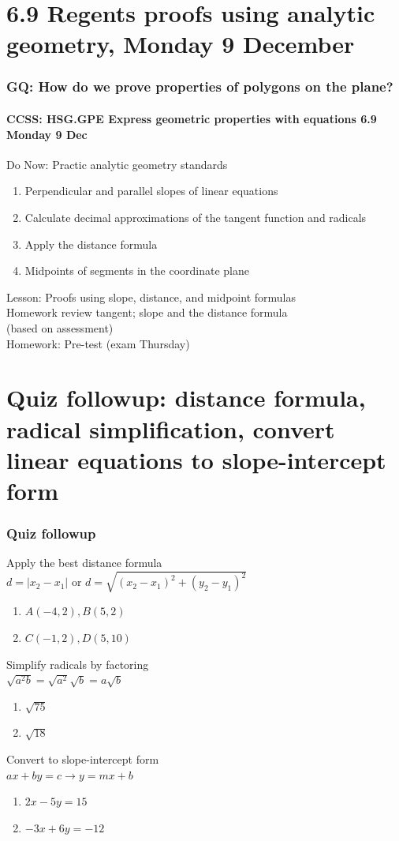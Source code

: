 \documentclass{beamer}
\begin{document}
\section{6.9 Regents proofs using analytic geometry, Monday 9 December}
\frame
{
  \frametitle{GQ: How do we prove properties of polygons on the plane?}
  \framesubtitle{CCSS: HSG.GPE Express geometric properties with equations \hfill \alert{6.9 Monday 9 Dec}}

  \begin{block}{Do Now: Practic analytic geometry standards}
  \begin{enumerate}
    \item Perpendicular and parallel slopes of linear equations
    \item Calculate decimal approximations of the tangent function and radicals
    \item Apply the distance formula
    \item Midpoints of segments in the coordinate plane
  \end{enumerate}
  \end{block}
  Lesson: Proofs using slope, distance, and midpoint formulas \\
  Homework review tangent; slope and the distance formula \\(based on assessment)\\[0.25cm]
  Homework: Pre-test (\alert{exam Thursday})
}

\section{Quiz followup: distance formula, radical simplification, convert linear equations to slope-intercept form}
\frame
{
  \frametitle{Quiz followup}

  \begin{block}{Apply the best distance formula\\ \qquad $d=|x_2-x_1|$ \qquad or \qquad $\displaystyle d=\sqrt{(x_2-x_1)^2+(y_2-y_1)^2}$}
    \begin{enumerate}
      \item $A(-4,2),B(5,2)$
      \item $C(-1,2),D(5,10)$
    \end{enumerate}
    \end{block}
  \begin{block}{Simplify radicals by factoring\\[0.2cm] \qquad $\sqrt{a^2b}=\sqrt{a^2}\sqrt{b}=a\sqrt{b}$}
    \begin{enumerate}
      \item $\sqrt{75}$
      \item $\sqrt{18}$
    \end{enumerate}
    \end{block}
  \begin{block}{Convert to slope-intercept form\\\qquad $ax+by=c \rightarrow y=mx+b$}
    \begin{enumerate}
      \item $2x-5y=15$
      \item $-3x+6y=-12$
    \end{enumerate}
    \end{block}
}
\end{document}

